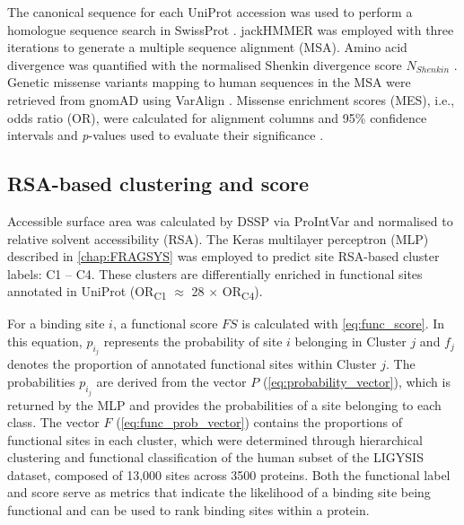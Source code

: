 The canonical sequence for each UniProt accession was used to perform a homologue sequence search in SwissProt \cite{BOUTET_2016_UNIPROT}. jackHMMER \cite{EDDY_1995_HMMER} was employed with three iterations to generate a multiple sequence alignment (MSA). Amino acid divergence was quantified with the normalised Shenkin \cite{SHENKIN_1991_SCORE} divergence score $N_{Shenkin}$ \cite{UTGES_2021_ANKS}. Genetic missense variants mapping to human sequences in the MSA were retrieved from gnomAD \cite{KARCZEWSKI_2020_GNOMAD} using VarAlign \cite{MACGOWAN_2017_VARIANTS}. Missense enrichment scores (MES), i.e., odds ratio (OR), were calculated for alignment columns \cite{MACGOWAN_2024_VARIANTS} and 95\% confidence intervals and \textit{p}-values used to evaluate their significance \cite{SZUMILAS_2010_ODDSRATIOS}. %

\subsection{RSA-based clustering and score}

Accessible surface area was calculated by DSSP \cite{KABSCH_1983_DSSP} via ProIntVar \cite{MACGOWAN_2020_DRSASP} and normalised \cite{TIEN_2013_RSA} to relative solvent accessibility (RSA). The Keras \cite{CHOLLET_2015_KERAS} multilayer perceptron (MLP) \cite{CYBENKO_1989_MLP} described in \autoref{chap:FRAGSYS} \cite{UTGES_2024_FRAGSYS} was employed to predict site RSA-based cluster labels: C1 – C4. These clusters are differentially enriched in functional sites annotated in UniProt \cite{NIGHTINGALE_2017_API} (OR\textsubscript{C1} $\approx$ 28 $\times$ OR\textsubscript{C4}).

For a binding site $i$, a functional score $FS$ is calculated with \autoref{eq:func_score}. In this equation, $p_{i_{j}}$ represents the probability of site $i$ belonging in Cluster $j$ and $f_j$ denotes the proportion of annotated functional sites within Cluster $j$. The probabilities $p_{i_{j}}$ are derived from the vector $P$ (\autoref{eq:probability_vector}), which is returned by the MLP and provides the probabilities of a site belonging to each class. The vector $F$ (\autoref{eq:func_prob_vector}) contains the proportions of functional sites in each cluster, which were determined through hierarchical clustering and functional classification of the human subset of the LIGYSIS dataset, composed of 13,000 sites across 3500 proteins. Both the functional label and score serve as metrics that indicate the likelihood of a binding site being functional and can be used to rank binding sites within a protein. %

